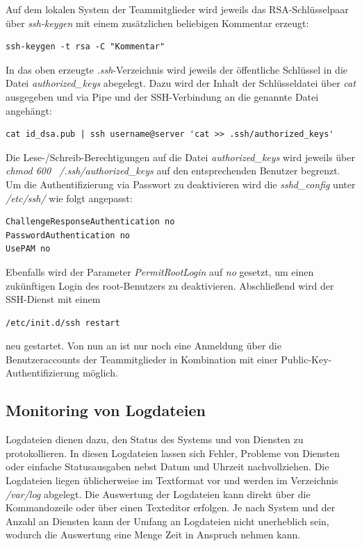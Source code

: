 Auf dem lokalen System der Teammitglieder wird jeweils das RSA-Schlüsselpaar über \textit{ssh-keygen} mit einem zusätzlichen beliebigen Kommentar erzeugt:

\begin{lstlisting}[style=customc]
ssh-keygen -t rsa -C "Kommentar"
\end{lstlisting}

In das oben erzeugte \textit{.ssh}-Verzeichnis wird jeweils der öffentliche Schlüssel in die Datei \textit{authorized\_keys} abegelegt. Dazu wird der Inhalt der Schlüsseldatei über \textit{cat} ausgegeben und via Pipe und der SSH-Verbindung an die genannte Datei angehängt:

\begin{lstlisting}[style=customc]
cat id_dsa.pub | ssh username@server 'cat >> .ssh/authorized_keys'
\end{lstlisting}

Die Lese-/Schreib-Berechtigungen auf die Datei \textit{authorized\_keys} wird jeweils über \textit{chmod 600 ~/.ssh/authorized\_keys} auf den entsprechenden Benutzer begrenzt.\\

Um die Authentifizierung via Passwort zu deaktivieren wird die \textit{sshd\_config} unter \textit{/etc/ssh/} wie folgt angepasst:

\begin{lstlisting}[style=customc]
ChallengeResponseAuthentication no
PasswordAuthentication no
UsePAM no
\end{lstlisting}

Ebenfalls wird der Parameter \textit{PermitRootLogin} auf \textit{no} gesetzt, um einen zukünftigen Login des root-Benutzers zu deaktivieren. Abschließend wird der SSH-Dienst mit einem

\begin{lstlisting}[style=customc]
/etc/init.d/ssh restart
\end{lstlisting}

neu gestartet. Von nun an ist nur noch eine Anmeldung über die Benutzeraccounts der Teammitglieder in Kombination mit einer Public-Key-Authentifizierung möglich.


\subsection{Monitoring von Logdateien}
\label{subsec:Monitoring von Logdateien}

Logdateien dienen dazu, den Status des Systems und von Diensten zu protokollieren. In diesen Logdateien lassen sich Fehler, Probleme von Diensten oder einfache Statusausgaben nebst Datum und Uhrzeit nachvollziehen. Die Logdateien liegen üblicherweise im Textformat vor und werden im Verzeichnis \textit{/var/log} abgelegt. Die Auswertung der Logdateien kann direkt über die Kommandozeile oder über einen Texteditor erfolgen. Je nach System und der Anzahl an Diensten kann der Umfang an Logdateien nicht unerheblich sein, wodurch die Auswertung eine Menge Zeit in Anspruch nehmen kann.

